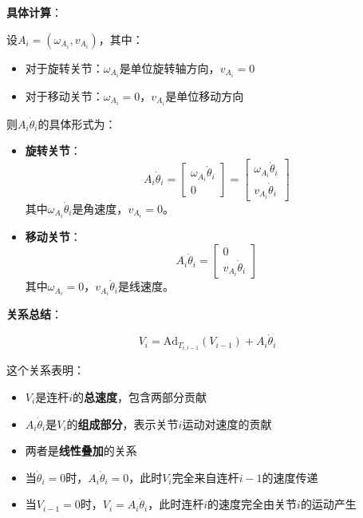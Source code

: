 \documentclass[12pt,a4paper]{article}
\begin{document}
\textbf{具体计算}：

设$A_i = (\omega_{A_i}, v_{A_i})$，其中：
\begin{itemize}
\item 对于旋转关节：$\omega_{A_i}$是单位旋转轴方向，$v_{A_i} = 0$
\item 对于移动关节：$\omega_{A_i} = 0$，$v_{A_i}$是单位移动方向
\end{itemize}

则$A_i \dot{\theta}_i$的具体形式为：

\begin{itemize}
\item \textbf{旋转关节}：
\begin{equation}
A_i \dot{\theta}_i = \begin{bmatrix}
\omega_{A_i} \dot{\theta}_i \\
0
\end{bmatrix} = \begin{bmatrix}
\omega_{A_i} \dot{\theta}_i \\
v_{A_i} \dot{\theta}_i
\end{bmatrix}
\end{equation}
其中$\omega_{A_i} \dot{\theta}_i$是角速度，$v_{A_i} = 0$。

\item \textbf{移动关节}：
\begin{equation}
A_i \dot{\theta}_i = \begin{bmatrix}
0 \\
v_{A_i} \dot{\theta}_i
\end{bmatrix}
\end{equation}
其中$\omega_{A_i} = 0$，$v_{A_i} \dot{\theta}_i$是线速度。
\end{itemize}

\textbf{关系总结}：

\begin{equation}
V_i = \text{Ad}_{T_{i,i-1}}(V_{i-1}) + A_i \dot{\theta}_i
\end{equation}

这个关系表明：
\begin{itemize}
\item $V_i$是连杆$i$的\textbf{总速度}，包含两部分贡献
\item $A_i \dot{\theta}_i$是$V_i$的\textbf{组成部分}，表示关节$i$运动对速度的贡献
\item 两者是\textbf{线性叠加}的关系
\item 当$\dot{\theta}_i = 0$时，$A_i \dot{\theta}_i = 0$，此时$V_i$完全来自连杆$i-1$的速度传递
\item 当$V_{i-1} = 0$时，$V_i = A_i \dot{\theta}_i$，此时连杆$i$的速度完全由关节$i$的运动产生
\end{itemize}
\end{document}
